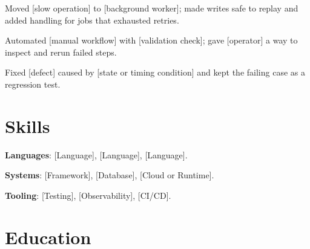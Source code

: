 \documentclass{resume}
\begin{document}
\begin{jobduties}
  \item Moved [slow operation] to [background worker]; made writes safe to replay and added handling for jobs that exhausted retries.
  \item Automated [manual workflow] with [validation check]; gave [operator] a way to inspect and rerun failed steps.
  \item Fixed [defect] caused by [state or timing condition] and kept the failing case as a regression test.
\end{jobduties}


\section{Skills}
\begin{skillitems}
  \item \textbf{Languages}: [Language], [Language], [Language].
  \item \textbf{Systems}: [Framework], [Database], [Cloud or Runtime].
  \item \textbf{Tooling}: [Testing], [Observability], [CI/CD].
\end{skillitems}

\section{Education}


\end{document}
